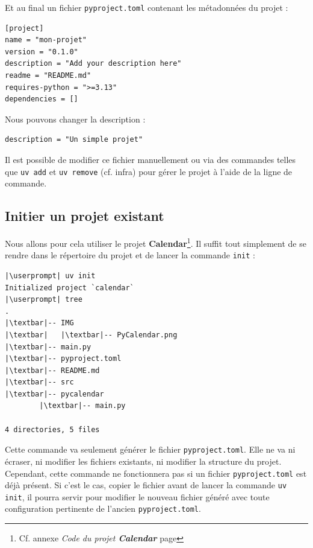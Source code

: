 Et au final un fichier \texttt{pyproject.toml} contenant les métadonnées du projet :
\begin{lstlisting}[style=file]
[project]
name = "mon-projet"
version = "0.1.0"
description = "Add your description here"
readme = "README.md"
requires-python = ">=3.13"
dependencies = []
\end{lstlisting}

Nous pouvons changer la description :
\begin{lstlisting}[style=file]
description = "Un simple projet"
\end{lstlisting}

Il est possible de modifier ce fichier manuellement ou via des commandes telles que \texttt{uv add} et \texttt{uv remove} (cf. infra) pour gérer le projet à l'aide de la ligne de commande.

\subsection*{Initier un projet existant}
Nous allons pour cela utiliser le projet \textbf{Calendar}\footnote{Cf. annexe \textit{Code du projet \textbf{Calendar}} page \pageref{code_calendar}}. Il suffit tout simplement de se rendre dans le répertoire du projet et de lancer la commande \texttt{init} :
\begin{lstlisting}[style=bash]
|\userprompt| uv init
Initialized project `calendar`
|\userprompt| tree  
.
|\textbar|-- IMG
|\textbar|   |\textbar|-- PyCalendar.png
|\textbar|-- main.py
|\textbar|-- pyproject.toml
|\textbar|-- README.md
|\textbar|-- src
|\textbar|-- pycalendar
        |\textbar|-- main.py

4 directories, 5 files
\end{lstlisting}

Cette commande va seulement générer le fichier \texttt{pyproject.toml}. Elle ne va ni écraser, ni modifier les fichiers existants, ni modifier la structure du projet. Cependant, cette commande ne fonctionnera pas si un fichier \texttt{pyproject.toml} est déjà présent. Si c'est le cas, copier le fichier avant de lancer la commande \texttt{uv init}, il pourra servir pour modifier le nouveau fichier généré avec toute configuration pertinente de l'ancien \texttt{pyproject.toml}.

